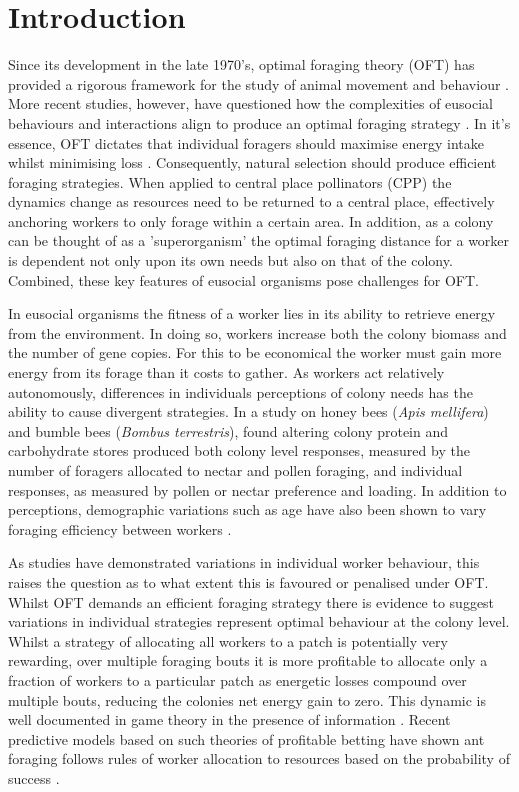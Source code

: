 \documentclass[11pt,usenames,dvipsnames]{article}
\begin{document}
\section{Introduction}

\begin{linenumbers}
\hspace{\parindent}
Since its development in the late 1970's, optimal foraging theory (OFT) has provided a rigorous framework for the study of animal movement and behaviour \citep{Pyke1984}. More recent studies, however, have questioned how the complexities of eusocial behaviours and interactions align to produce an optimal foraging strategy \citep{Baddeley2019}. In it's essence, OFT dictates that individual foragers should maximise energy intake whilst minimising loss \citep{Pyke1984}. Consequently, natural selection should produce efficient foraging strategies. When applied to central place pollinators (CPP) the dynamics change as resources need to be returned to a central place, effectively anchoring workers to only forage within a certain area. In addition, as a colony can be thought of as a 'superorganism' \citep{Holldobler2009} the optimal foraging distance for a worker is dependent not only upon its own needs but also on that of the colony. Combined, these key features of eusocial organisms pose challenges for OFT. 

In eusocial organisms the fitness of a worker lies in its ability to retrieve energy from the environment. In doing so, workers increase both the colony biomass and the number of gene copies. For this to be economical the worker must gain more energy from its forage than it costs to gather. As workers act relatively autonomously, differences in individuals perceptions of colony needs has the ability to cause divergent strategies. In a study on honey bees (\textit{Apis mellifera}) and bumble bees (\textit{Bombus terrestris}), \cite{Hendriksma2019} found altering colony protein and carbohydrate stores produced both colony level responses, measured by the number of foragers allocated to nectar and pollen foraging, and individual responses, as measured by pollen or nectar preference and loading. In addition to perceptions, demographic variations such as age have also been shown to vary foraging efficiency between workers \citep{Schippers2006, Klein2019}.

As studies have demonstrated variations in individual worker behaviour, this raises the question as to what extent this is favoured or penalised under OFT. Whilst OFT demands an efficient foraging strategy there is evidence to suggest variations in individual strategies represent optimal behaviour at the colony level. Whilst a strategy of allocating all workers to a patch is potentially very rewarding, over multiple foraging bouts it is more profitable to allocate only a fraction of workers to a particular patch as energetic losses compound over multiple bouts, reducing the colonies net energy gain to zero. This dynamic is well documented in game theory in the presence of information \citep{Kelly1956}. Recent predictive models based on such theories of profitable betting have shown ant foraging follows rules of worker allocation to resources based on the probability of success \citep{Baddeley2019}.


\end{linenumbers}
\end{document}
